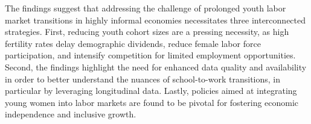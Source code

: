 The findings suggest that addressing the challenge of prolonged youth labor market transitions in highly informal economies necessitates three interconnected strategies. First, reducing youth cohort sizes are a pressing necessity, as high fertility rates delay demographic dividends, reduce female labor force participation, and intensify competition for limited employment opportunities. Second, the findings highlight the need for enhanced data quality and availability in order to better understand the nuances of school-to-work transitions, in particular by leveraging longitudinal data. Lastly, policies aimed at integrating young women into labor markets are found to be pivotal for fostering economic independence and inclusive growth.


